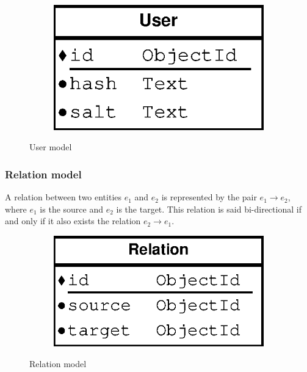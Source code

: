 \begin{figure}[H]
    \centering
    \begin{subfigure}[b]{0.20\textwidth}
    	\includegraphics[width=\textwidth]{figures/model_user}
    \end{subfigure}
    \caption{User model}
\end{figure} 

\subsubsection{Relation model}

A relation between two entities $e_1$ and $e_2$ is represented by the pair $e_1\rightarrow e_2$, where $e_1$ is the source and $e_2$ is the target. This relation is said bi-directional if and only if it also exists the relation $e_2\rightarrow e_1$.

\begin{figure}[H]
    \centering
    \begin{subfigure}[b]{0.25\textwidth}
    	\includegraphics[width=\textwidth]{figures/model_relation}
    \end{subfigure}
    \caption{Relation model}
\end{figure} 

